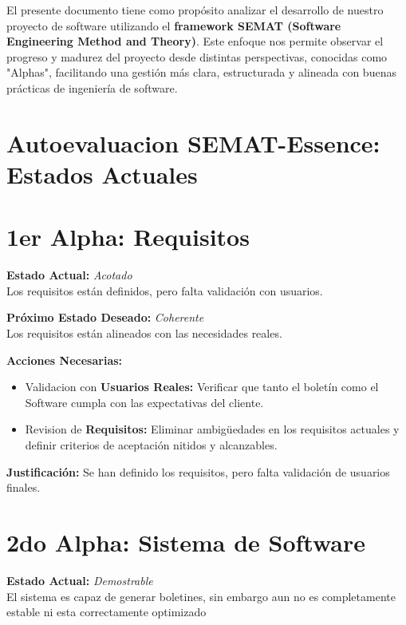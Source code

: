\documentclass[12pt]{article}
\begin{document}
El presente documento tiene como propósito analizar 
el desarrollo de nuestro proyecto de software utilizando 
el \textbf{framework SEMAT (Software Engineering Method 
and Theory)}. Este enfoque nos permite observar el 
progreso y madurez del proyecto desde distintas 
perspectivas, conocidas como "Alphas", facilitando una 
gestión más clara, estructurada y alineada con buenas 
prácticas de ingeniería de software.


\section*{Autoevaluacion SEMAT-Essence: Estados Actuales}

\section{1er Alpha: Requisitos}

\textbf{Estado Actual:} \textit{Acotado} \\
Los requisitos están definidos, pero falta validación con usuarios.

\vspace{0.2cm}

\textbf{Próximo Estado Deseado:} \textit{Coherente} \\
Los requisitos están alineados con las necesidades reales.

\vspace{0.5cm}

\textbf{Acciones Necesarias:}
\begin{itemize}
    \item Validacion con \textbf{Usuarios Reales:} Verificar que tanto 
    el boletín como el Software cumpla con las expectativas del cliente.
    \item Revision de \textbf{Requisitos:} Eliminar ambigüedades en los 
    requisitos actuales y definir criterios de aceptación nitidos y alcanzables.
\end{itemize}

\vspace{0.3cm}

\textbf{Justificación:} Se han definido los requisitos, pero falta validación de usuarios finales.


\section{2do Alpha: Sistema de Software}

\textbf{Estado Actual:} \textit{Demostrable} \\
El sistema es capaz de generar boletines, sin embargo aun
no es completamente estable ni esta correctamente optimizado
\vspace{0.2cm}
\end{document}
